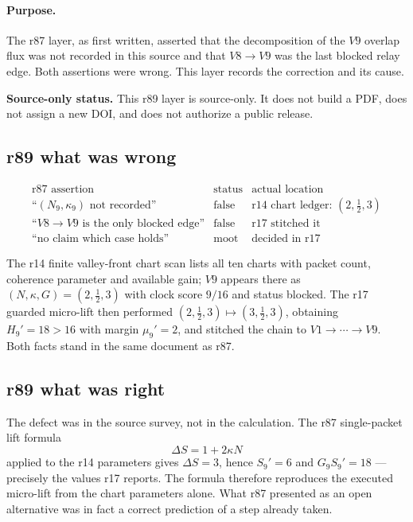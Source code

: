 \paragraph{Purpose.}
The r87 layer, as first written, asserted that the decomposition of the \(V9\) overlap flux
was not recorded in this source and that \(V8\to V9\) was the last blocked relay edge.  Both
assertions were wrong.  This layer records the correction and its cause.

\noindent\textbf{Source-only status.}
This r89 layer is source-only.  It does not build a PDF, does not assign a new DOI, and does
not authorize a public release.

\subsection*{r89 what was wrong}
\label{subsec:r89-what-was-wrong}

\[
\begin{array}{l|l|l}
\text{r87 assertion} & \text{status} & \text{actual location}\\
\hline
\text{``}(N_9,\kappa_9)\text{ not recorded''} & \text{false} &
\text{r14 chart ledger: }(2,\tfrac12,3)\\
\text{``}V8\to V9\text{ is the only blocked edge''} & \text{false} &
\text{r17 stitched it}\\
\text{``no claim which case holds''} & \text{moot} &
\text{decided in r17}
\end{array}
\]

The r14 finite valley-front chart scan lists all ten charts with packet count, coherence
parameter and available gain; \(V9\) appears there as \((N,\kappa,G)=(2,\tfrac12,3)\) with
clock score \(9/16\) and status blocked.  The r17 guarded micro-lift then performed
\((2,\tfrac12,3)\mapsto(3,\tfrac12,3)\), obtaining \(H_9'=18>16\) with margin
\(\mu_9'=2\), and stitched the chain to \(V1\to\cdots\to V9\).  Both facts stand in the same
document as r87.

\subsection*{r89 what was right}
\label{subsec:r89-what-was-right}

The defect was in the source survey, not in the calculation.  The r87 single-packet lift
formula
\[
\Delta S=1+2\kappa N
\]
applied to the r14 parameters gives \(\Delta S=3\), hence \(S_9'=6\) and \(G_9S_9'=18\) ---
precisely the values r17 reports.  The formula therefore reproduces the executed micro-lift
from the chart parameters alone.  What r87 presented as an open alternative was in fact a
correct prediction of a step already taken.

